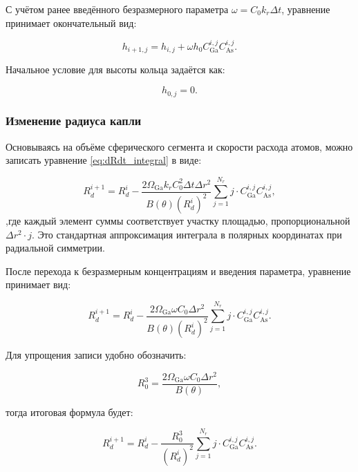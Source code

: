 \documentclass[14pt,oneside]{extarticle}
\begin{document}
С учётом ранее введённого безразмерного параметра \( \omega = C_0 k_r \Delta t \), уравнение принимает окончательный вид:

\begin{equation}
h_{i+1,j} = h_{i,j} + \omega h_0 C_{\text{Ga}}^{i,j} C_{\text{As}}^{i,j}.
\end{equation}

Начальное условие для высоты кольца задаётся как:

\begin{equation}
h_{0,j} = 0.
\end{equation}

\subsubsection{Изменение радиуса капли}

Основываясь на объёме сферического сегмента и скорости расхода атомов, можно записать уравнение \eqref{eq:dRdt_integral} в виде:

\begin{equation}
R_d^{i+1} = R_d^i - \frac{2 \Omega_{\text{Ga}} k_r C_0^2 \Delta t \Delta r^2}{B(\theta) (R_d^i)^2} \sum_{j=1}^{N_r} j \cdot C_{\text{Ga}}^{i,j} C_{\text{As}}^{i,j},
\end{equation}
,где каждый элемент суммы соответствует участку площадью, пропорциональной $\Delta r^2 \cdot j$. Это стандартная аппроксимация интеграла в полярных координатах при радиальной симметрии.

После перехода к безразмерным концентрациям и введения параметра, уравнение принимает вид:

\begin{equation}
R_d^{i+1} = R_d^i - \frac{2 \Omega_{\text{Ga}} \omega C_0 \Delta r^2}{B(\theta) (R_d^i)^2} \sum_{j=1}^{N_r} j \cdot C_{\text{Ga}}^{i,j} C_{\text{As}}^{i,j}.
\end{equation}

Для упрощения записи удобно обозначить:

\begin{equation}
R_0^3 = \frac{2 \Omega_{\text{Ga}} \omega C_0 \Delta r^2}{B(\theta)},
\end{equation}

тогда итоговая формула будет:

\begin{equation}
R_d^{i+1} = R_d^i - \frac{R_0^3}{(R_d^i)^2} \sum_{j=1}^{N_r} j \cdot C_{\text{Ga}}^{i,j} C_{\text{As}}^{i,j}.
\end{equation}
\end{document}
